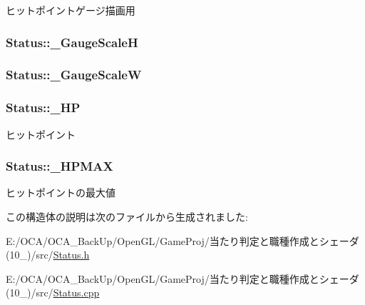 ヒットポイントゲージ描画用 

\hypertarget{struct_status_a976309d13dbf7a2a1fedf53d7e3cf734}{
\subsubsection[{\-\_\-\-Gauge\-Scale\-H}]{ Status\-::\-\_\-\-Gauge\-Scale\-H\hspace{0.3cm}{\ttfamily [protected]}}}\label{struct_status_a976309d13dbf7a2a1fedf53d7e3cf734}
\hypertarget{struct_status_a4fb9273b657a123cea761c8d6dcba3c2}{
\subsubsection[{\-\_\-\-Gauge\-Scale\-W}]{ Status\-::\-\_\-\-Gauge\-Scale\-W\hspace{0.3cm}{\ttfamily [protected]}}}\label{struct_status_a4fb9273b657a123cea761c8d6dcba3c2}
\hypertarget{struct_status_a1dbae1c54e1e3ee336e965d9d53545bb}{
\subsubsection[{\-\_\-\-H\-P}]{ Status\-::\-\_\-\-H\-P\hspace{0.3cm}{\ttfamily [protected]}}}\label{struct_status_a1dbae1c54e1e3ee336e965d9d53545bb}


ヒットポイント 

\hypertarget{struct_status_a556f1e65222442eea47f89608a53f462}{
\subsubsection[{\-\_\-\-H\-P\-M\-A\-X}]{ Status\-::\-\_\-\-H\-P\-M\-A\-X\hspace{0.3cm}{\ttfamily [protected]}}}\label{struct_status_a556f1e65222442eea47f89608a53f462}


ヒットポイントの最大値 



この構造体の説明は次のファイルから生成されました\-:\begin{DoxyCompactItemize}
\item 
E\-:/\-O\-C\-A/\-O\-C\-A\-\_\-\-Back\-Up/\-Open\-G\-L/\-Game\-Proj/当たり判定と職種作成とシェーダ(10\-\_)/src/\hyperlink{_status_8h}{Status.\-h}\item 
E\-:/\-O\-C\-A/\-O\-C\-A\-\_\-\-Back\-Up/\-Open\-G\-L/\-Game\-Proj/当たり判定と職種作成とシェーダ(10\-\_)/src/\hyperlink{_status_8cpp}{Status.\-cpp}\end{DoxyCompactItemize}
